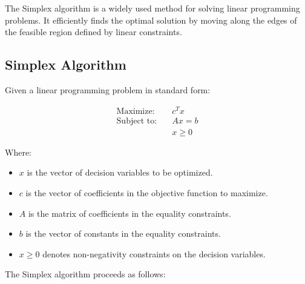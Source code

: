 \documentclass[a4paper]{article}
\begin{document}
The Simplex algorithm is a widely used method for solving linear programming problems. It efficiently finds the optimal solution by moving along the edges of the feasible region defined by linear constraints.

\subsection{Simplex Algorithm}

Given a linear programming problem in standard form:

\begin{align*}
\text{Maximize:} \quad & c^Tx \\
\text{Subject to:} \quad & Ax = b \\
& x \geq 0
\end{align*}

Where:
\begin{itemize}
    \item $x$ is the vector of decision variables to be optimized.
    \item $c$ is the vector of coefficients in the objective function to maximize.
    \item $A$ is the matrix of coefficients in the equality constraints.
    \item $b$ is the vector of constants in the equality constraints.
    \item $x \geq 0$ denotes non-negativity constraints on the decision variables.
\end{itemize}

The Simplex algorithm proceeds as follows:
\end{document}
